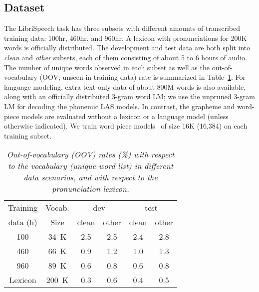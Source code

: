  \subsection{Dataset}
 \vspace{-1mm}
The LibriSpeech task \cite{panayotov2015librispeech} has three subsets with different amounts of
transcribed training data: 100hr, 460hr, and 960hr. A lexicon with pronunciations for 200K words
is officially distributed. The development and test data are both split into \textit{clean}
and \textit{other} subsets, each of them consisting of about 5 to 6 hours of audio. The number of unique words
observed in each subset as well as the out-of-vocabulary (OOV; unseen in training
data) rate is summarized in Table~\ref{tab:oov}.
For language modeling, extra text-only data of about 800M words is also
available, along with an officially distributed 3-gram word LM; we use the
unpruned 3-gram LM for decoding the phonemic LAS models.
In contrast, the grapheme and word-piece models are evaluated without a lexicon or a language model (unless otherwise indicated).
We train word piece models~\cite{SchusterN12} of size 16K (16,384) on each training subset.
\begin{table}[h]
	\centering
	\caption{\it Out-of-vocabulary (OOV) rates (\%) with respect to the
	vocabulary (unique word list) in different data scenarios, and with respect to the pronunciation lexicon.}
	 \label{tab:oov}
	 	\vspace{-2mm}
	\begin{tabular}{ |c|c|c|c|c|c|} \hline
		Training  & Vocab.    & \multicolumn{2}{|c|}{dev} & \multicolumn{2}{|c|}{test}    \\ \cline{3-6}
		data (h)  & Size      & clean & other & clean & other    \\ \hline
		100   &  34~K &  2.5  & 2.5 & 2.4 & 2.8  \\
		460   &  66~K &  0.9  & 1.2 & 1.0 & 1.3  \\
		960   &  89~K &  0.6  & 0.8 & 0.6 & 0.8  \\  \hline \hline
		Lexicon  & 200~K   & 0.3  & 0.6 & 0.4 & 0.5  \\ \hline
	\end{tabular}
\vspace{-5mm}
\end{table}
\vspace{-2mm}

